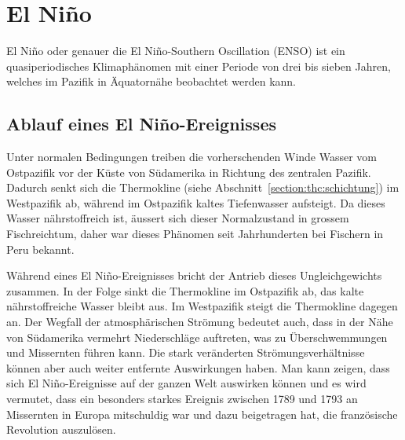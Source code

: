 %
%
%
\section{El Niño\label{section:elnino}}
El Niño oder genauer die El Niño-Southern Oscillation (ENSO) ist ein
quasiperiodisches Klima\-phänomen mit einer Periode von drei bis sieben
Jahren, welches im Pazifik in Äquatornähe beobachtet werden kann.

\subsection{Ablauf eines El Niño-Ereignisses\label{subsection:elnino:ablauf}}
Unter normalen Bedingungen treiben die vorherschenden Winde Wasser vom
Ostpazifik vor der Küste von Südamerika in Richtung des zentralen Pazifik.
Dadurch senkt sich die Thermokline
(siehe Abschnitt~\ref{section:thc:schichtung})
im Westpazifik ab, während im 
Ostpazifik kaltes Tiefenwasser aufsteigt.
Da dieses Wasser nährstoffreich ist, äussert sich dieser Normalzustand
in grossem Fischreichtum, daher war dieses Phänomen seit Jahrhunderten
bei Fischern in Peru bekannt.

Während eines El Niño-Ereignisses bricht der Antrieb dieses Ungleichgewichts
zusammen.
In der Folge sinkt die Thermokline im Ostpazifik ab,
das kalte nährstoffreiche
Wasser bleibt aus.
Im Westpazifik steigt die Thermokline dagegen an.
Der Wegfall der atmosphärischen Strömung bedeutet auch, dass in der Nähe
von Südamerika vermehrt Niederschläge auftreten, was zu Überschwemmungen
und Missernten führen kann.
Die stark veränderten Strömungsverhältnisse können aber auch weiter entfernte
Auswirkungen haben.
Man kann zeigen, dass sich El Niño-Ereignisse auf der ganzen Welt auswirken
können und es wird vermutet, dass ein besonders starkes Ereignis zwischen
1789 und 1793 an Missernten in Europa mitschuldig war und dazu beigetragen
hat, die französische Revolution auszulösen.

